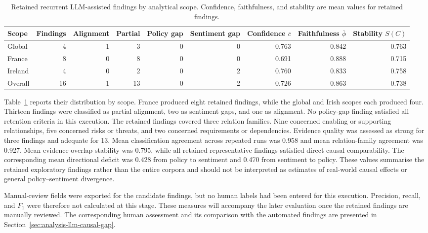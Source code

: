 \begin{table}[ht]
\centering
\scriptsize
\setlength{\tabcolsep}{4pt}
\renewcommand{\arraystretch}{1.08}
\begin{tabular}{lrrrrrrrr}
\hline
Scope &
Findings &
Alignment &
Partial &
Policy gap &
Sentiment gap &
Confidence $\overline{c}$ &
Faithfulness $\overline{\phi}$ &
Stability $S(C)$ \\
\hline
Global
& 4 & 1 & 3 & 0 & 0
& 0.763 & 0.842 & 0.763 \\

France
& 8 & 0 & 8 & 0 & 0
& 0.691 & 0.888 & 0.715 \\

Ireland
& 4 & 0 & 2 & 0 & 2
& 0.760 & 0.833 & 0.758 \\

\hline
Overall
& 16 & 1 & 13 & 0 & 2
& 0.726 & 0.863 & 0.738 \\
\hline
\end{tabular}
\caption{Retained recurrent LLM-assisted findings by analytical scope. Confidence,
faithfulness, and stability are mean values for retained findings.}
\label{tab:impl-llm-findings}
\end{table}

Table~\ref{tab:impl-llm-findings} reports their distribution by scope. France
produced eight retained findings, while the global and Irish scopes each produced
four. Thirteen findings were classified as partial alignment, two as sentiment gaps,
and one as alignment. No policy-gap finding satisfied all retention criteria in this
execution. The retained findings covered three relation families. Nine concerned
enabling or supporting relationships, five concerned risks or threats, and two
concerned requirements or dependencies. Evidence quality was assessed as strong for
three findings and adequate for 13. Mean classification agreement across repeated
runs was 0.958 and mean relation-family agreement was 0.927. Mean evidence-overlap
stability was 0.795, while all retained representative findings satisfied direct
causal comparability. The corresponding mean directional deficit was 0.428 from
policy to sentiment and 0.470 from sentiment to policy. These values summarise the
retained exploratory findings rather than the entire corpora and should not be
interpreted as estimates of real-world causal effects or general policy--sentiment
divergence.

Manual-review fields were exported for the candidate findings, but no human labels
had been entered for this execution. Precision, recall, and $F_1$ were therefore not
calculated at this stage. These measures will accompany the later evaluation once the
retained findings are manually reviewed. The corresponding human assessment and its
comparison with the automated findings are presented in
Section~\ref{sec:analysis-llm-causal-gap}.

